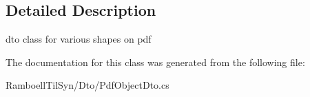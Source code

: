 \subsection{Detailed Description}
dto class for various shapes on pdf 



The documentation for this class was generated from the following file\+:\begin{DoxyCompactItemize}
\item 
Ramboell\+Til\+Syn/\+Dto/Pdf\+Object\+Dto.\+cs\end{DoxyCompactItemize}
